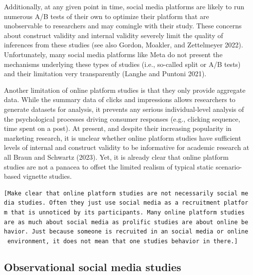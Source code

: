 \documentclass[
  a4paper,
]{scrreprt}
\begin{document}
Additionally, at any given point in time, social media platforms are
likely to run numerous A/B tests of their own to optimize their platform
that are unobservable to researchers and may comingle with their study.
These concerns about construct validity and internal validity severely
limit the quality of inferences from these studies (see also Gordon,
Moakler, and Zettelmeyer 2022). Unfortunately, many social media
platforms like Meta do not present the mechanisms underlying these types
of studies (i.e., so-called split or A/B tests) and their limitation
very transparently (Langhe and Puntoni 2021).

Another limitation of online platform studies is that they only provide
aggregate data. While the summary data of clicks and impressions allows
researchers to generate datasets for analysis, it prevents any serious
individual-level analysis of the psychological processes driving
consumer responses (e.g., clicking sequence, time spent on a post). At
present, and despite their increasing popularity in marketing research,
it is unclear whether online platform studies have sufficient levels of
internal and construct validity to be informative for academic research
at all Braun and Schwartz (2023). Yet, it is already clear that online
platform studies are not a panacea to offset the limited realism of
typical static scenario-based vignette studies.

\texttt{{[}Make\ clear\ that\ online\ platform\ studies\ are\ not\ necessarily\ social\ media\ studies.\ Often\ they\ just\ use\ social\ media\ as\ a\ recruitment\ platform\ that\ is\ unnoticed\ by\ its\ participants.\ Many\ online\ platform\ studies\ are\ as\ much\ about\ social\ media\ as\ prolific\ studies\ are\ about\ online\ behavior.\ Just\ because\ someone\ is\ recruited\ in\ an\ social\ media\ or\ online\ environment,\ it\ does\ not\ mean\ that\ one\ studies\ behavior\ in\ there.{]}}

\hypertarget{observational-social-media-studies}{%
\subsection{Observational social media
studies}\label{observational-social-media-studies}}
\end{document}
